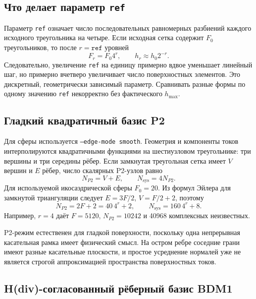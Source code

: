 \documentclass[12pt,a4paper]{article}
\begin{document}
\subsection{Что делает параметр \texttt{ref}}

Параметр \texttt{ref} означает число последовательных равномерных разбиений
каждого исходного треугольника на четыре. Если исходная сетка содержит $F_0$
треугольников, то после $r=\texttt{ref}$ уровней
\begin{equation}
  F_r=F_0 4^r,\qquad h_r\approx h_0 2^{-r}.
  \label{eq:ref-scaling}
\end{equation}
Следовательно, увеличение \texttt{ref} на единицу примерно вдвое уменьшает
линейный шаг, но примерно вчетверо увеличивает число поверхностных элементов.
Это дискретный, геометрически зависимый параметр. Сравнивать разные формы по
одному значению \texttt{ref} некорректно без фактического $h_{\max}$.

\subsection{Гладкий квадратичный базис P2}

Для сферы используется \texttt{--edge-mode smooth}. Геометрия и компоненты
токов интерполируются квадратичными функциями на шестиузловом треугольнике:
три вершины и три середины рёбер. Если замкнутая треугольная сетка имеет $V$
вершин и $E$ рёбер, число скалярных P2-узлов равно
\begin{equation}
  N_{P2}=V+E,\qquad
  N_{\mathrm{sys}}=4N_{P2}.
  \label{eq:p2-dofs}
\end{equation}
Для используемой икосаэдрической сферы $F_0=20$. Из формул Эйлера для замкнутой
триангуляции следует $E=3F/2$, $V=F/2+2$, поэтому
\begin{equation}
  N_{P2}=2F+2=40\,4^r+2,\qquad
  N_{\mathrm{sys}}=160\,4^r+8.
  \label{eq:sphere-dofs}
\end{equation}
Например, $r=4$ даёт $F=5120$, $N_{P2}=10242$ и 40968 комплексных неизвестных.

P2-режим естественен для гладкой поверхности, поскольку одна непрерывная
касательная рамка имеет физический смысл. На остром ребре соседние грани имеют
разные касательные плоскости, и простое усреднение нормалей уже не является
строгой аппроксимацией пространства поверхностных токов.

\subsection{H(div)-согласованный рёберный базис BDM1}
\end{document}
